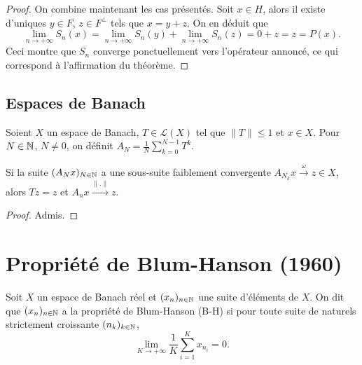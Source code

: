 \begin{proof}
  On combine maintenant les cas présentés. Soit $x\in H$, alors il existe
  d'uniques $y\in F$, $z\in F^{\perp}$ tels que $x = y + z$. On en déduit que
  $$\lim_{n\to+\infty}S_n(x) =
  \lim_{n\to+\infty}S_n(y) + \lim_{n\to+\infty}S_n(z)=
  0 + z = z = P(x).$$
  Ceci montre que $S_n$ converge ponctuellement vers l'opérateur annoncé,
  ce qui correspond à l'affirmation du théorème.


\end{proof}

\subsection{Espaces de Banach}
\begin{thm}
  Soient $X$ un espace de Banach, $T\in\mathcal L(X)$ tel que $\|T\|\leq 1$
  et $x\in X$. Pour $N\in\mathbb{N}$, $N\neq 0$, on définit
  $A_N = \frac{1}{N}\sum_{k=0}^{N-1}T^k$.

  Si la suite $(A_Nx)_{N\in\mathbb{N}}$ a une sous-suite faiblement convergente
  $A_{N_k}x\xrightarrow{\omega}z\in X$, alors $Tz = z$ et
  $A_nx \xrightarrow{\|.\|} z$.
\end{thm}
\begin{proof}
  Admis.
\end{proof}
\section{Propriété de Blum-Hanson (1960)}
\begin{df}
  Soit $X$ un espace de Banach réel et $(x_n)_{n\in\mathbb{N}}$ une suite d'éléments de
  $X$. On dit que $(x_n)_{n\in\mathbb{N}}$ a la propriété de Blum-Hanson (B-H) si
  pour toute suite de naturels strictement croissante $(n_k)_{k\in\mathbb{N}}$,
  $$\lim_{K\to+\infty}\frac{1}{K}\sum_{i=1}^Kx_{n_i} = 0.$$
\end{df}

